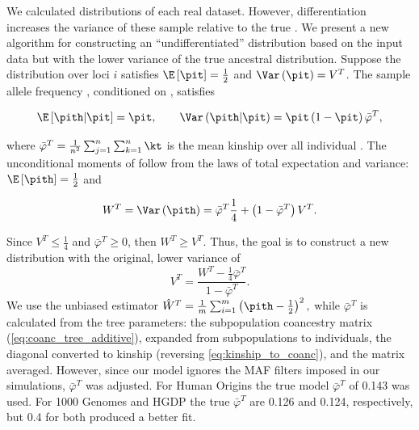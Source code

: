 \documentclass[11pt]{article}
\begin{document}
\begin{linenumbers}
We calculated \pith distributions of each real dataset.
However, differentiation increases the variance of these sample \pith relative to the true \pit \citep{ochoa_estimating_2021}.
We present a new algorithm for constructing an ``undifferentiated'' distribution based on the input data but with the lower variance of the true ancestral distribution.
Suppose the \pit distribution over loci $i$ satisfies $\E \left[ \pit \right] = \frac{1}{2}$ and $\Var \left( \pit \right) = V^T$.
The sample allele frequency \pith, conditioned on \pit, satisfies
\begin{linenomath*}
$$
\E \left[ \pith \middle| \pit \right]
=
\pit
, \quad\quad
\Var \left( \pith \middle| \pit \right)
=
\pit \left( 1 - \pit \right) \bar{\varphi}^T
,
$$
\end{linenomath*}
where $\bar{\varphi}^T = \frac{1}{n^2} \sum_{j=1}^n \sum_{k=1}^n \kt$ is the mean kinship over all individual \citep{ochoa_estimating_2021}.
The unconditional moments of \pith follow from the laws of total expectation and variance: 
$
\E \left[ \pith \right]
=
\frac{1}{2}
$
and
\begin{linenomath*}
\begin{equation*}
  W^T
  =
  \Var \left( \pith \right)
  =
  \bar{\varphi}^T \frac{1}{4}
  + \left( 1 - \bar{\varphi}^T \right) V^T
  .
\end{equation*}
\end{linenomath*}
Since $V^T \le \frac{1}{4}$ and $\bar{\varphi}^T \ge 0$, then $W^T \ge V^T$.
Thus, the goal is to construct a new distribution with the original, lower variance of
\begin{equation}
  \label{eq:var_undiff}
  V^T
  =
  \frac{ W^T - \frac{1}{4} \bar{\varphi}^T }{ 1 - \bar{\varphi}^T }
  .
\end{equation}
We use the unbiased estimator
$
\hat{W}^T
=
\frac{1}{m} \sum_{i=1}^m \left( \pith - \frac{1}{2} \right)^2
,
$
while $\bar{\varphi}^T$ is calculated from the tree parameters: the subpopulation coancestry matrix (\cref{eq:coanc_tree_additive}), expanded from subpopulations to individuals, the diagonal converted to kinship (reversing \cref{eq:kinship_to_coanc}), and the matrix averaged.
However, since our model ignores the MAF filters imposed in our simulations, $\bar{\varphi}^T$ was adjusted.
For Human Origins the true model $\bar{\varphi}^T$ of 0.143 was used.
For 1000 Genomes and HGDP the true $\bar{\varphi}^T$ are 0.126 and 0.124, respectively, but 0.4 for both produced a better fit.


\end{linenumbers}
\end{document}
